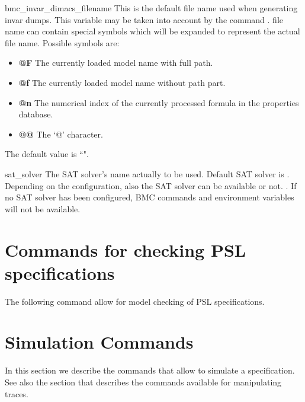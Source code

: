 \begin{nusmvVar} {bmc\_invar\_dimacs\_filename}{}{}
This is the default file name used when generating \dimacs invar
dumps. This variable may be taken into account by the command
.  \dimacs file name can contain special symbols which will
be expanded to represent the actual file name. Possible symbols are:
\begin{itemize}
\item {\bf @F}
The currently loaded model name with full path. 
\item {\bf @f}
The currently loaded model name without path part. 
\item {\bf @n}
The numerical index of the currently processed formula in the properties
database.
\item {\bf @@}
The `@' character.   
\end{itemize}
The default value is ``".\\
\end{nusmvVar}

\begin{nusmvVar} {sat\_solver}{}{\minisat}
The SAT solver's name actually to be used. Default SAT solver
is \minisat.  Depending on the \nusmv configuration, also the \zchaff
SAT solver can be available or not. \zchaffminisatnotice. If no SAT
solver has been configured, BMC commands and environment variables
will not be available.
\end{nusmvVar}



\section{Commands for checking PSL specifications}
\label{Commands for checking PSL specifications}

The following command allow for model checking of PSL specifications.




\section{Simulation Commands}
\label{Simulation Commands}

In this section we describe the commands that allow to simulate a
\nusmv specification. See also the section  that
describes the commands available for manipulating traces.

